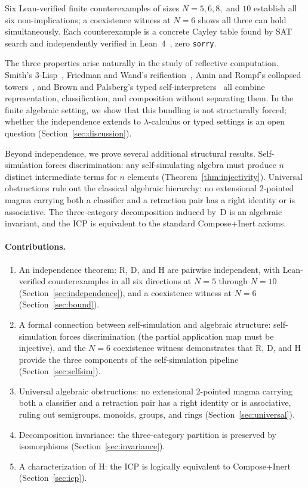 \documentclass[a4paper,UKenglish,cleveref,autoref,thm-restate]{lipics-v2021}
\begin{document}
Six Lean-verified finite counterexamples of sizes $N\!=\!5, 6, 8,$ and $10$ establish all six non-implications; a coexistence witness at $N\!=\!6$ shows all three can hold simultaneously. Each counterexample is a concrete Cayley table found by SAT search and independently verified in Lean~4~\cite{moura21}, zero \texttt{sorry}.

The three properties arise naturally in the study of reflective computation. Smith's 3-Lisp~\cite{smith84}, Friedman and Wand's reification~\cite{friedman84}, Amin and Rompf's collapsed towers~\cite{amin18}, and Brown and Palsberg's typed self-interpreters~\cite{brown16} all combine representation, classification, and composition without separating them. In the finite algebraic setting, we show that this bundling is not structurally forced; whether the independence extends to $\lambda$-calculus or typed settings is an open question (Section~\ref{sec:discussion}).

Beyond independence, we prove several additional structural results. Self-simulation forces discrimination: any self-simulating algebra must produce $n$ distinct intermediate terms for $n$ elements (Theorem~\ref{thm:injectivity}). Universal obstructions rule out the classical algebraic hierarchy: no extensional 2-pointed magma carrying both a classifier and a retraction pair has a right identity or is associative. The three-category decomposition induced by~D is an algebraic invariant, and the ICP is equivalent to the standard Compose+Inert axioms.

\paragraph{Contributions.}
\begin{enumerate}
  \item An independence theorem: R, D, and H are pairwise independent, with Lean-verified counterexamples in all six directions at $N\!=\!5$ through $N\!=\!10$ (Section~\ref{sec:independence}), and a coexistence witness at $N\!=\!6$ (Section~\ref{sec:bound}).
  \item A formal connection between self-simulation and algebraic structure: self-simulation forces discrimination (the partial application map must be injective), and the $N\!=\!6$ coexistence witness demonstrates that R, D, and H provide the three components of the self-simulation pipeline (Section~\ref{sec:selfsim}).
  \item Universal algebraic obstructions: no extensional 2-pointed magma carrying both a classifier and a retraction pair has a right identity or is associative, ruling out semigroups, monoids, groups, and rings (Section~\ref{sec:universal}).
  \item Decomposition invariance: the three-category partition is preserved by isomorphisms (Section~\ref{sec:invariance}).
  \item A characterization of H: the ICP is logically equivalent to Compose+Inert (Section~\ref{sec:icp}).
\end{enumerate}
\end{document}
